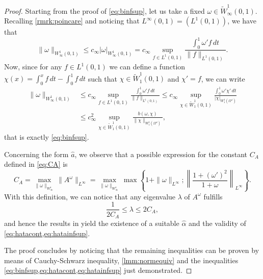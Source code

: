 \documentclass[final,hidelinks]{siamart1116Arxiv}
\numberwithin{theorem}{section}
\newcommand{\gtest}{{\chi}}
\newcommand{\avW}[2]{{\tilde{W}^{#1}_{#2}(0,1)}}
\newcommand{\Wg}{\avW{1}{\infty}}
\newcommand{\Wc}{\avW{1}{1}}
\newcommand{\Wone}{{W^1_1(\Omega^\omega)}}
\renewcommand{\hat}[1]{\widehat{#1}}
\begin{document}
\begin{proof}
 Starting from the proof of \cref{eq:binfsup}, let us take a fixed $\omega\in\Wg$.
 Recalling \cref{rmrk:poincare} and noticing that $L^\infty(0,1)=(L^1(0,1))$, we have that
 \begin{equation}
  \|\omega\|_{W^1_\infty(0,1)} \leq c_\infty |\omega|_{W^1_\infty(0,1)} = c_\infty \sup_{f\in L^1(0,1)} \frac{\int_0^1\omega'f\,dt}{\|f\|_{L^1(0,1)}}.
 \end{equation}
 Now, since for any $f\in L^1(0,1)$ we can define a function $\gtest(x)=\int_0^x f\,dt-\int_0^1f\,dt$ such that $\chi\in\Wc$ and $\chi'=f$, we can write
 \begin{equation}\label{eq:infsupb}\begin{aligned}
  \|\omega\|_{W^1_\infty(0,1)} &\leq c_\infty \sup_{f\in L^1(0,1)} \frac{\int_0^1\omega'f\,dt}{\|f\|_{L^1(0,1)}}\leq c_\infty \sup_{\gtest\in\Wc}\frac{\int_0^1\omega'\gtest'\,dt}{|\gtest|_\Wone} \\
  &\leq c_\infty^2 \sup_{\gtest\in\Wc}\frac{b(\omega,\gtest)}{\|\gtest\|_\Wone},
 \end{aligned}\end{equation}
 that is exactly \cref{eq:binfsup}.
 
 Concerning the form $\hat a$, we observe that a possible expression for the constant $C_A$ defined in \cref{eq:CA} is
 \begin{equation}
  C_A = \max_{\|\omega\|_{W^1_\infty}}\|A^\omega\|_{L^\infty} = \max_{\|\omega\|_{W^1_\infty}} \max\left\{1+\|\omega\|_{L^\infty} ; \left\|\frac{1+(\omega')^2}{1+\omega}\right\|_{L^\infty}\right\}.
 \end{equation}
 With this definition, we can notice that any eigenvalue $\lambda$ of $A^\omega$ fulfills
 \begin{equation}
  \frac{1}{2C_A}\leq\lambda\leq 2C_A,
 \end{equation}
 and hence the results in \cite{Meyers} yield the existence of a suitable $\hat\alpha$ and the validity of \cref{eq:hatacont,eq:hatainfsup}.

 The proof concludes by noticing that the remaining inequalities can be proven by means of Cauchy-Schwarz inequality, \cref{lmm:normequiv} and the inequalities \cref{eq:binfsup,eq:hatacont,eq:hatainfsup} just demonstrated.
\end{proof}
\end{document}
